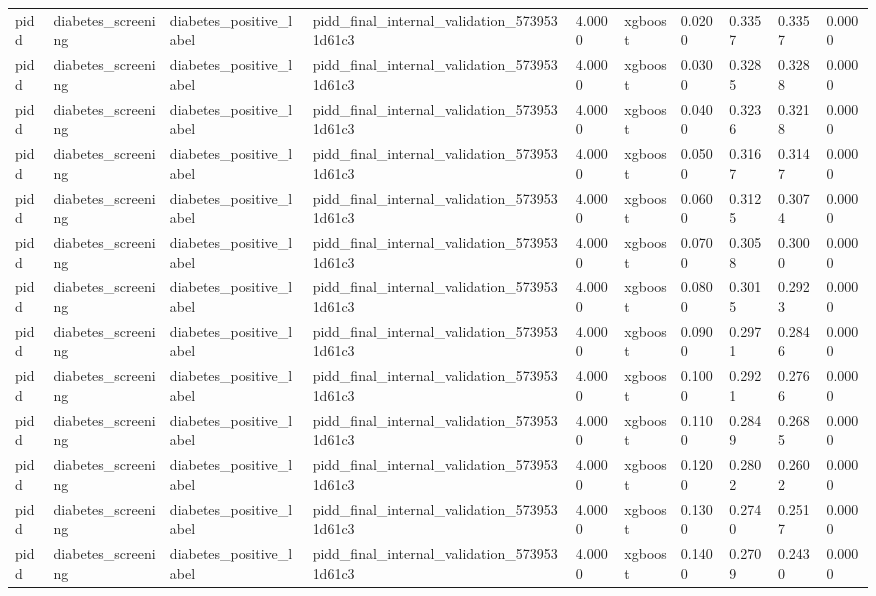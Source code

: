 \begin{tabular}{llllllllll}
pidd & diabetes\_screening & diabetes\_positive\_label & pidd\_final\_internal\_validation\_5739531d61c3 & 4.0000 & xgboost & 0.0200 & 0.3357 & 0.3357 & 0.0000 \\
pidd & diabetes\_screening & diabetes\_positive\_label & pidd\_final\_internal\_validation\_5739531d61c3 & 4.0000 & xgboost & 0.0300 & 0.3285 & 0.3288 & 0.0000 \\
pidd & diabetes\_screening & diabetes\_positive\_label & pidd\_final\_internal\_validation\_5739531d61c3 & 4.0000 & xgboost & 0.0400 & 0.3236 & 0.3218 & 0.0000 \\
pidd & diabetes\_screening & diabetes\_positive\_label & pidd\_final\_internal\_validation\_5739531d61c3 & 4.0000 & xgboost & 0.0500 & 0.3167 & 0.3147 & 0.0000 \\
pidd & diabetes\_screening & diabetes\_positive\_label & pidd\_final\_internal\_validation\_5739531d61c3 & 4.0000 & xgboost & 0.0600 & 0.3125 & 0.3074 & 0.0000 \\
pidd & diabetes\_screening & diabetes\_positive\_label & pidd\_final\_internal\_validation\_5739531d61c3 & 4.0000 & xgboost & 0.0700 & 0.3058 & 0.3000 & 0.0000 \\
pidd & diabetes\_screening & diabetes\_positive\_label & pidd\_final\_internal\_validation\_5739531d61c3 & 4.0000 & xgboost & 0.0800 & 0.3015 & 0.2923 & 0.0000 \\
pidd & diabetes\_screening & diabetes\_positive\_label & pidd\_final\_internal\_validation\_5739531d61c3 & 4.0000 & xgboost & 0.0900 & 0.2971 & 0.2846 & 0.0000 \\
pidd & diabetes\_screening & diabetes\_positive\_label & pidd\_final\_internal\_validation\_5739531d61c3 & 4.0000 & xgboost & 0.1000 & 0.2921 & 0.2766 & 0.0000 \\
pidd & diabetes\_screening & diabetes\_positive\_label & pidd\_final\_internal\_validation\_5739531d61c3 & 4.0000 & xgboost & 0.1100 & 0.2849 & 0.2685 & 0.0000 \\
pidd & diabetes\_screening & diabetes\_positive\_label & pidd\_final\_internal\_validation\_5739531d61c3 & 4.0000 & xgboost & 0.1200 & 0.2802 & 0.2602 & 0.0000 \\
pidd & diabetes\_screening & diabetes\_positive\_label & pidd\_final\_internal\_validation\_5739531d61c3 & 4.0000 & xgboost & 0.1300 & 0.2740 & 0.2517 & 0.0000 \\
pidd & diabetes\_screening & diabetes\_positive\_label & pidd\_final\_internal\_validation\_5739531d61c3 & 4.0000 & xgboost & 0.1400 & 0.2709 & 0.2430 & 0.0000 \\

\end{tabular}
